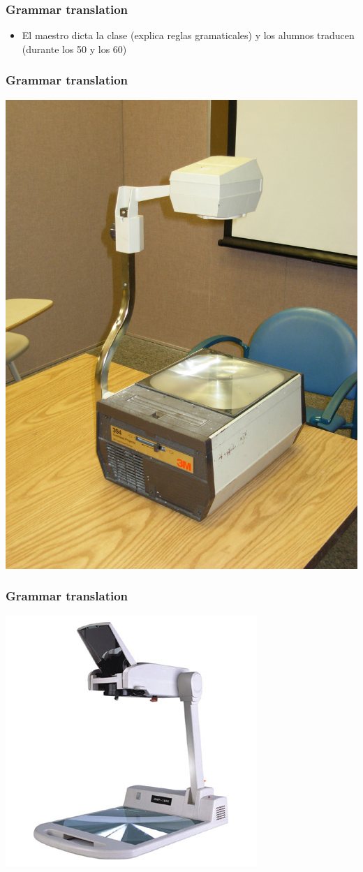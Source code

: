 \documentclass{beamer}
\begin{document}
\begin{frame}
	\frametitle{Grammar translation}

	\begin{itemize}
		\item El maestro dicta la clase (explica reglas gramaticales) y los alumnos traducen (durante los 50 y los 60)
	\end{itemize}
\end{frame}

\begin{frame}
	\frametitle{Grammar translation}

	\begin{center}
		\includegraphics[width=.5\textwidth]{figures/overhead1.JPG}
	\end{center}
\end{frame}

\begin{frame}
	\frametitle{Grammar translation}

	\begin{center}
		\includegraphics[width=.65\textwidth]{figures/overhead2.JPG}
	\end{center}
\end{frame}
\end{document}
